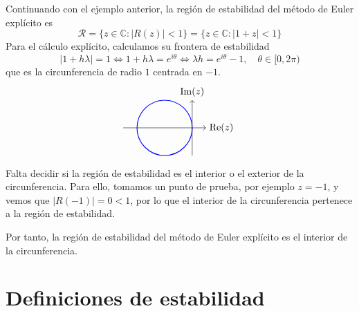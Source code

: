 \begin{ejem}
    Continuando con el ejemplo anterior, la regi\'on de estabilidad del m\'etodo de Euler expl\'icito es
    $$\mathcal{R} = \{ z \in \mathbb{C} : |R(z)| < 1 \} = \{ z \in \mathbb{C} : |1 + z| < 1 \}$$
    Para el c\'alculo expl\'icito, calculamos su frontera de estabilidad
    $$|1+h \lambda | =1 \iff 1+h \lambda = e^{i\theta} \iff \lambda h = e^{i\theta} - 1, \quad \theta \in [0, 2\pi)$$
    que es la circunferencia de radio $1$ centrada en $-1$.  
    $$\begin{tikzpicture}
        \draw[->] (-2.5,0) -- (.5,0) node[right] {$\text{Re}(z)$};
        \draw[->] (0,-1) -- (0,1) node[above] {$\text{Im}(z)$};
        \draw[thick, blue] (-1,0) circle(1);
    \end{tikzpicture}$$
    Falta decidir si la regi\'on de estabilidad es el interior o el exterior de la circunferencia. Para ello, tomamos un punto de prueba, por ejemplo $z=-1$, y vemos que $|R(-1)| = 0 < 1$, por lo que el interior de la circunferencia pertenece a la regi\'on de estabilidad. 
    
    Por tanto, la regi\'on de estabilidad del m\'etodo de Euler expl\'icito es el interior de la circunferencia.
\end{ejem}

\section{Definiciones de estabilidad}


